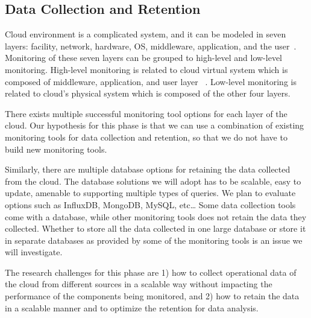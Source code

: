 \subsection{Data Collection and Retention}


Cloud environment is a complicated system, and it can be modeled in seven layers: facility, network, hardware, OS, middleware, application, and the user~\cite{spring2011monitoring}. Monitoring of these seven layers can be grouped to high-level and low-level monitoring. High-level monitoring is related to cloud virtual system which is composed of middleware, application, and user layer ~\cite{Aceto2013}. Low-level monitoring is related to cloud’s physical system which is composed of the other four layers. 

There exists multiple successful monitoring tool options for each layer of the cloud. Our hypothesis for this phase is that we can use a combination of existing monitoring tools for data collection and retention, so that we do not have to build new monitoring tools.

Similarly, there are multiple database options for retaining the data collected from the cloud. The database solutions we will adopt has to be scalable, easy to update, amenable to supporting multiple types of queries. We plan to evaluate options such as InfluxDB, MongoDB, MySQL, etc… Some data collection tools come with a database, while other monitoring tools does not retain the data they collected. Whether to store all the data collected in one large database or store it in separate databases as provided by some of the monitoring tools is an issue we will investigate.

The research challenges for this phase are 1) how to collect operational data of the cloud from different sources in a scalable way without impacting the performance of the components being monitored, and 2)  how to retain the data in a scalable manner and to optimize the retention for data analysis.


